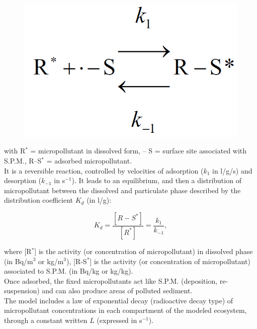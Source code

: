\begin{figure}[H]
  \centering
  \includegraphics[scale=0.4]{graphics/image60.png}
\end{figure}


with R$^\ast$ = micropollutant in dissolved form, – S = surface site associated with S.P.M.,
R–S$^{\ast}$ = adsorbed micropollutant.\\

It is a reversible reaction, controlled by velocities of adsorption ($k_1$ in l/g/s)
and desorption ($k_{-1}$ in s$^{-1}$).
It leads to an equilibrium, and then a distribution of micropollutant
between the dissolved and particulate phase described
by the distribution coefficient $K_d$ (in l/g):

\begin{equation}
  K_d = \frac{[R-S^\ast]}{[R^\ast]} = \frac{k_1}{k_{-1}},
\end{equation}

where [R$^\ast$] is the activity (or concentration of micropollutant)
in dissolved phase (in Bq/m$^3$ or kg/m$^3$), [R-S$^\ast$] is the activity
(or concentration of micropollutant) associated to S.P.M. (in Bq/kg or kg/kg).\\

Once adsorbed, the fixed micropollutants act like S.P.M. (deposition, re-suspension)
and can also produce areas of polluted sediment.\\

The model includes a law of exponential decay (radioactive decay type) of micropollutant
concentrations in each compartment of the modeled ecosystem,
through a constant written $L$ (expressed in s$^{-1}$).\\

